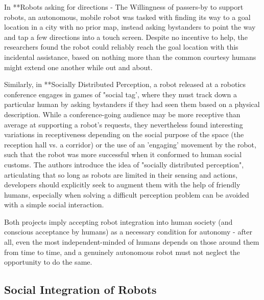 \documentclass{sfuthesis}
\begin{document}
In **Robots asking for directions - The Willingness of passers-by to support robots, an autonomous, mobile robot was tasked with finding its way to a goal location in a city with no prior map, instead asking bystanders to point the way and tap a few directions into a touch screen. Despite no incentive to help, the researchers found the robot could reliably reach the goal location with this incidental assistance, based on nothing more than the common courtesy humans might extend one another while out and about.

Similarly, in **Socially Distributed Perception, a robot released at a robotics conference engages in games of "social tag', where they must track down a particular human by asking bystanders if they had seen them based on a physical description. While a conference-going audience may be more receptive than average at supporting a robot's requests, they nevertheless found interesting variations in receptiveness depending on the social purpose of the space (the reception hall vs. a corridor) or the use of an 'engaging' movement by the robot, such that the robot was more successful when it conformed to human social customs. The authors introduce the idea of "socially distributed perception", articulating that so long as robots are limited in their sensing and actions, developers should explicitly seek to augment them with the help of friendly humans, especially when solving a difficult perception problem can be avoided with a simple social interaction. 

Both projects imply accepting robot integration into human society (and conscious acceptance by humans) as a necessary condition for autonomy - after all, even the most independent-minded of humans depends on those around them from time to time, and a genuinely autonomous robot must not neglect the opportunity to do the same.




\subsection{Social Integration of Robots}
\end{document}
